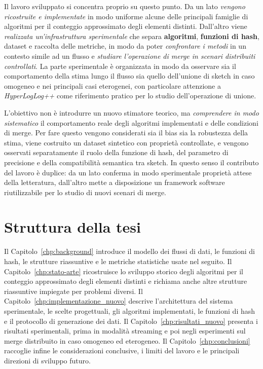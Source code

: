 Il lavoro sviluppato si concentra proprio su questo punto. Da un lato \textit{vengono
ricostruite e implementate} in modo uniforme alcune delle principali famiglie di
algoritmi per il conteggio approssimato degli elementi distinti. Dall'altro viene
\textit{realizzata un'infrastruttura sperimentale} che separa \textbf{algoritmi}, \textbf{funzioni di
hash}, dataset e raccolta delle metriche, in modo da poter \textit{confrontare i metodi}
in un contesto simile ad un flusso e \textit{studiare l'operazione di merge in scenari distribuiti controllati}.
La parte sperimentale è organizzata in modo da osservare sia il comportamento
della stima lungo il flusso sia quello dell'unione di sketch in caso omogeneo e
nei principali casi eterogenei, con particolare attenzione a \textit{HyperLogLog++} come
riferimento pratico per lo studio dell'operazione di unione.

L'obiettivo non è introdurre un nuovo stimatore teorico, ma \textit{comprendere in modo
sistematico} il comportamento reale degli algoritmi implementati e delle
condizioni di merge. Per fare questo vengono considerati sia il bias sia la
robustezza della stima, viene costruito un dataset sintetico con proprietà
controllate, e vengono osservati separatamente il ruolo della funzione di hash,
del parametro di precisione e della compatibilità semantica tra sketch. In
questo senso il contributo del lavoro è duplice: da un lato conferma in modo
sperimentale proprietà attese della letteratura, dall'altro mette a
disposizione un framework software riutilizzabile per lo studio di nuovi scenari di
merge.

\section{Struttura della tesi}

Il Capitolo~\ref{chp:background} introduce il modello dei flussi di dati, le
funzioni di hash, le strutture riassuntive e le metriche statistiche usate nel
seguito. Il Capitolo~\ref{chp:stato-arte} ricostruisce lo sviluppo storico
degli algoritmi per il conteggio approssimato degli elementi distinti e richiama anche
altre strutture riassuntive impiegate per problemi diversi. Il
Capitolo~\ref{chp:implementazione_nuovo} descrive l'architettura del sistema
sperimentale, le scelte progettuali, gli algoritmi implementati, le funzioni di
hash e il protocollo di generazione dei dati. Il
Capitolo~\ref{chp:risultati_nuovo} presenta i risultati sperimentali, prima in
modalità streaming e poi negli esperimenti sul merge distribuito in caso
omogeneo ed eterogeneo. Il Capitolo~\ref{chp:conclusioni} raccoglie infine le
considerazioni conclusive, i limiti del lavoro e le principali direzioni di
sviluppo futuro.

